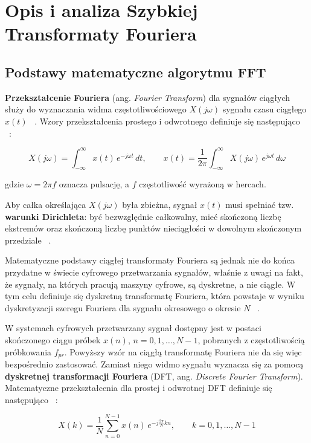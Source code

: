 \section{Opis i analiza Szybkiej Transformaty Fouriera}
\subsection{Podstawy matematyczne algorytmu FFT}
\textbf{Przekształcenie Fouriera} (ang. \textit{Fourier Transform}) dla sygnałów ciągłych służy do wyznaczania widma częstotliwościowego $X(j\omega)$ sygnału czasu ciągłego $x(t)$ ~\cite{ZielinskiDSP}. Wzory przekształcenia prostego i odwrotnego definiuje się następująco ~\cite{ZielinskiDSP}:

\begin{equation}
X(j\omega) = \int_{-\infty}^{\infty} x(t)\, e^{-j\omega t}\, dt,
\qquad
x(t) = \frac{1}{2\pi}\int_{-\infty}^{\infty} X(j\omega)\, e^{j\omega t}\, d\omega
\end{equation}

gdzie $\omega = 2\pi f$ oznacza pulsację, a $f$ częstotliwość wyrażoną w hercach.

Aby całka określająca $X(j\omega)$ była zbieżna, sygnał $x(t)$ musi spełniać tzw. \textbf{warunki Dirichleta}: być bezwzględnie całkowalny, mieć skończoną liczbę ekstremów oraz skończoną liczbę punktów nieciągłości w dowolnym skończonym przedziale ~\cite{ZielinskiDSP}.

Matematyczne podstawy ciągłej transformaty Fouriera są jednak nie do końca przydatne w świecie cyfrowego przetwarzania sygnałów, właśnie z uwagi na fakt, że sygnały, na których pracują maszyny cyfrowe, są dyskretne, a nie ciągłe. W tym celu definiuje się dyskretną transformatę Fouriera, która powstaje w wyniku dyskretyzacji szeregu Fouriera dla sygnału okresowego o okresie $N$ ~\cite{ZielinskiDSP}.

W systemach cyfrowych przetwarzany sygnał dostępny jest w postaci skończonego ciągu próbek $x(n)$, $n = 0, 1, \dots, N-1$, pobranych z częstotliwością próbkowania $f_{pr}$. Powyższy wzór na ciągłą transformatę Fouriera nie da się więc bezpośrednio zastosować. Zamiast niego widmo sygnału wyznacza się za pomocą \textbf{dyskretnej transformacji Fouriera} (DFT, ang. \textit{Discrete Fourier Transform}). Matematyczne przekształcenia dla prostej i odwrotnej DFT definiuje się następująco ~\cite{ZielinskiDSP}:

\begin{equation}
X(k) = \frac{1}{N}\sum_{n=0}^{N-1} x(n)\, e^{-j\frac{2\pi}{N}kn},
\qquad k = 0, 1, \dots, N-1
\label{eq:dft_analiza}
\end{equation}

